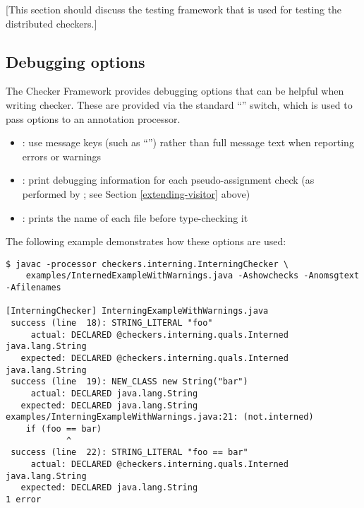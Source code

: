[This section should discuss the testing framework that is used for
testing the distributed checkers.]


\subsection{Debugging options}

The Checker Framework provides debugging options that can be helpful when
writing checker. These are provided via the standard  ``''
switch, which is used to pass options to an annotation processor.

\begin{itemize}

\item {}: use message keys (such as ``'')
rather than full message text when reporting errors or warnings

\item {}: print debugging information for each
pseudo-assignment check (as performed by ; see Section
\ref{extending-visitor} above)

\item {}: prints the name of each file before type-checking it

\end{itemize}

The following example demonstrates how these options are used:

\begin{smaller}
\begin{Verbatim}
$ javac -processor checkers.interning.InterningChecker \
    examples/InternedExampleWithWarnings.java -Ashowchecks -Anomsgtext -Afilenames

[InterningChecker] InterningExampleWithWarnings.java
 success (line  18): STRING_LITERAL "foo"
     actual: DECLARED @checkers.interning.quals.Interned java.lang.String
   expected: DECLARED @checkers.interning.quals.Interned java.lang.String
 success (line  19): NEW_CLASS new String("bar")
     actual: DECLARED java.lang.String
   expected: DECLARED java.lang.String
examples/InterningExampleWithWarnings.java:21: (not.interned)
    if (foo == bar)
            ^
 success (line  22): STRING_LITERAL "foo == bar"
     actual: DECLARED @checkers.interning.quals.Interned java.lang.String
   expected: DECLARED java.lang.String
1 error
\end{Verbatim}
\end{smaller}

